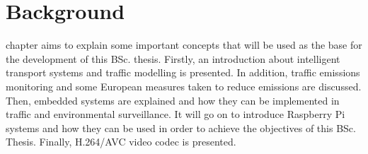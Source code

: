 
\chapter{Background}
\label{chap:background}

 chapter aims to explain some important concepts that will be used as the base for the development of this \ac{BSc.} thesis. Firstly, an introduction about intelligent transport systems and traffic modelling is presented. In addition, traffic emissions monitoring and some European measures taken to reduce emissions are discussed. Then, embedded systems are explained and how they can be implemented in traffic and environmental surveillance. It will go on to introduce Raspberry Pi systems and how they can be used in order to achieve the objectives of this \ac{BSc.} Thesis. Finally, H.264/AVC video codec is presented.

